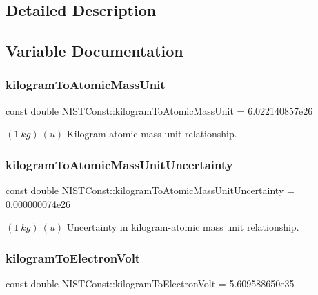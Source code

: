 \subsection{Detailed Description}


\subsection{Variable Documentation}
\mbox{\label{group___kilogram_gaa6a5187e436c3ce769319ad4968d53ff}} 
\subsubsection{\texorpdfstring{kilogram\+To\+Atomic\+Mass\+Unit}{kilogramToAtomicMassUnit}}
{\footnotesize\ttfamily const double N\+I\+S\+T\+Const\+::kilogram\+To\+Atomic\+Mass\+Unit = 6.\+022140857e26}

$(1\ kg)\ (u)$ Kilogram-\/atomic mass unit relationship. \mbox{\label{group___kilogram_ga0a840aeb3ea862ed078ead0caf886dfb}} 
\subsubsection{\texorpdfstring{kilogram\+To\+Atomic\+Mass\+Unit\+Uncertainty}{kilogramToAtomicMassUnitUncertainty}}
{\footnotesize\ttfamily const double N\+I\+S\+T\+Const\+::kilogram\+To\+Atomic\+Mass\+Unit\+Uncertainty = 0.\+000000074e26}

$(1\ kg)\ (u)$ Uncertainty in kilogram-\/atomic mass unit relationship. \mbox{\label{group___kilogram_gae0d25d28f6a0596f2dd5f8b3dc5ebb38}} 
\subsubsection{\texorpdfstring{kilogram\+To\+Electron\+Volt}{kilogramToElectronVolt}}
{\footnotesize\ttfamily const double N\+I\+S\+T\+Const\+::kilogram\+To\+Electron\+Volt = 5.\+609588650e35}

